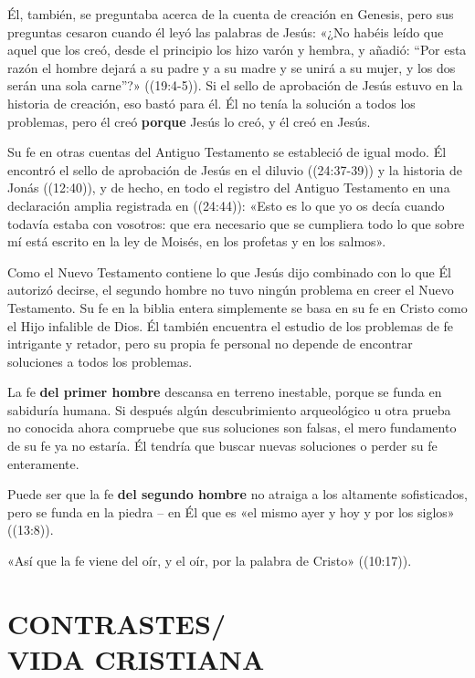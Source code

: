 \documentclass[12pt, twoside, openright]{book}
\begin{document}
Él, también, se preguntaba acerca de la cuenta de creación en Genesis, pero sus preguntas cesaron cuando él leyó las palabras de Jesús: «¿No habéis leído que aquel que los creó, desde el principio los hizo varón y hembra, y añadió: “Por esta razón el hombre dejará a su padre y a su madre y se unirá a su mujer, y los dos serán una sola carne”?» ((19:4-5)). Si el sello de aprobación de Jesús estuvo en la historia de creación, eso bastó para él. Él no tenía la solución a todos los problemas, pero él creó \textbf{porque} Jesús lo creó, y él creó en Jesús. 

Su fe en otras cuentas del Antiguo Testamento se estableció de igual modo. Él encontró el sello de aprobación de Jesús en el diluvio ((24:37-39)) y la historia de Jonás ((12:40)), y de hecho, en todo el registro del Antiguo Testamento en una declaración amplia registrada en ((24:44)): «Esto es lo que yo os decía cuando todavía estaba con vosotros: que era necesario que se cumpliera todo lo que sobre mí está escrito en la ley de Moisés, en los profetas y en los salmos».

Como el Nuevo Testamento contiene lo que Jesús dijo combinado con lo que Él autorizó decirse, el segundo hombre no tuvo ningún problema en creer el Nuevo Testamento. Su fe en la biblia entera simplemente se basa en su fe en Cristo como el Hijo infalible de Dios. Él también encuentra el estudio de los problemas de fe intrigante y retador, pero su propia fe personal no depende de encontrar soluciones a todos los problemas. 

La fe \textbf{del primer hombre} descansa en terreno inestable, porque se funda en sabiduría humana. Si después algún descubrimiento arqueológico u otra prueba no conocida ahora compruebe que sus soluciones son falsas, el mero fundamento de su fe ya no estaría. Él tendría que buscar nuevas soluciones o perder su fe enteramente. 

Puede ser que la fe \textbf{del segundo hombre} no atraiga a los altamente sofisticados, pero se funda en la piedra – en Él que es «el mismo ayer y hoy y por los siglos» ((13:8)).

 «Así que la fe viene del oír, y el oír, por la palabra de Cristo» ((10:17)).

\chapter{CONTRASTES/\\ VIDA CRISTIANA}
\end{document}
